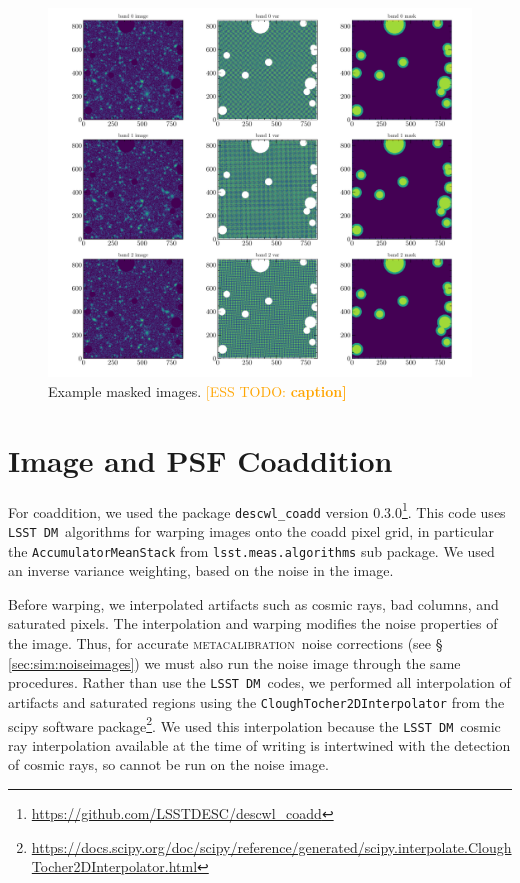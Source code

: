 \documentclass[iop, twocolappendix, appendixfloats, numberedappendix, apj]{hackemulateapj}
\newcommand{\esstodo}[1]{\textcolor{orange}{[ESS TODO: \bf #1]}}
\newcommand{\dm}{\texttt{LSST DM}}
\newcommand{\mcal}{\textsc{metacalibration}}
\begin{document}
\begin{figure}
    \includegraphics[width=\columnwidth]{example-masked-image.pdf}
    \caption{
        Example masked images. \esstodo{caption}
    }
\end{figure}



\section{Image and PSF Coaddition} \label{sec:coadding}

For coaddition, we used the package \texttt{descwl\_coadd} version
0.3.0\footnote{\url{https://github.com/LSSTDESC/descwl_coadd}}.  This code uses
\dm\ algorithms for warping images onto the coadd pixel grid, in particular the
\texttt{AccumulatorMeanStack} from \texttt{lsst.meas.algorithms} sub package.
We used an inverse variance weighting, based on the noise in the image.

Before warping, we interpolated artifacts such as cosmic rays, bad columns, and
saturated pixels.  The interpolation and warping modifies the noise properties
of the image.  Thus, for accurate \mcal\ noise corrections (see \S
\ref{sec:sim:noiseimages}) we must also run the noise image through the same
procedures.  Rather than use the \dm\ codes, we performed all interpolation of
artifacts and saturated regions using the \texttt{CloughTocher2DInterpolator}
from the scipy software
package\footnote{\url{https://docs.scipy.org/doc/scipy/reference/generated/scipy.interpolate.CloughTocher2DInterpolator.html}}.
We used this interpolation because the \dm\ cosmic ray interpolation available
at the time of writing is intertwined with the detection of cosmic rays, so
cannot be run on the noise image.
\end{document}
